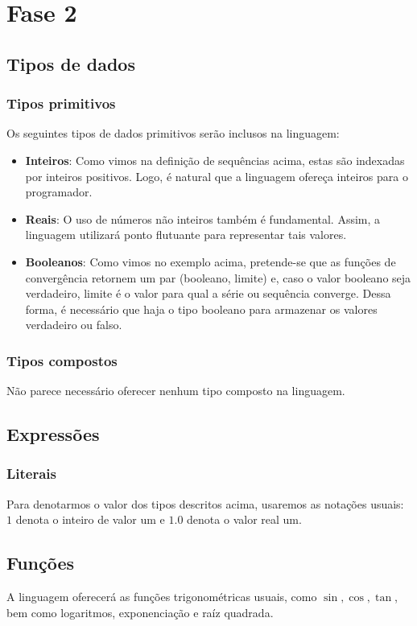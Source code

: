 \documentclass[a4 paper, 12pt]{article}
\begin{document}
\section{Fase 2}
\subsection{Tipos de dados}
\subsubsection{Tipos primitivos}
Os seguintes tipos de dados primitivos ser\~ao inclusos na linguagem:

\begin{itemize}
\item \textbf{Inteiros}: Como vimos na defini\c c\~ao de sequ\^encias
  acima, estas s\~ao indexadas por inteiros positivos. Logo, \'e
  natural que a linguagem ofere\c ca inteiros para o programador.
\item \textbf{Reais}: O uso de n\'umeros n\~ao inteiros
  tamb\'em \'e fundamental. Assim, a linguagem utilizar\'a ponto
  flutuante para representar tais valores.
\item \textbf{Booleanos}: Como vimos no exemplo acima, pretende-se que
  as fun\c c\~oes de converg\^encia retornem um par (booleano, limite)
  e, caso o valor booleano seja verdadeiro, limite \'e o valor para
  qual a s\'erie ou sequ\^encia converge. Dessa forma, \'e
  necess\'ario que haja o tipo booleano para armazenar os valores
  verdadeiro ou falso.
\end{itemize}

\subsubsection{Tipos compostos}
N\~ao parece necess\'ario oferecer nenhum tipo composto na linguagem.
\subsection{Express\~oes}
\subsubsection{Literais}
Para denotarmos o valor dos tipos descritos acima, usaremos as nota\c
c\~oes usuais: $1$ denota o inteiro de valor um e $1.0$ denota o valor
real um.

\subsection{Fun\c c\~oes}
A linguagem oferecer\'a as fun\c c\~oes trigonom\'etricas usuais, como
$\sin, \cos, \tan$, bem como logaritmos, exponencia\c c\~ao e ra\'iz
quadrada.
\end{document}
